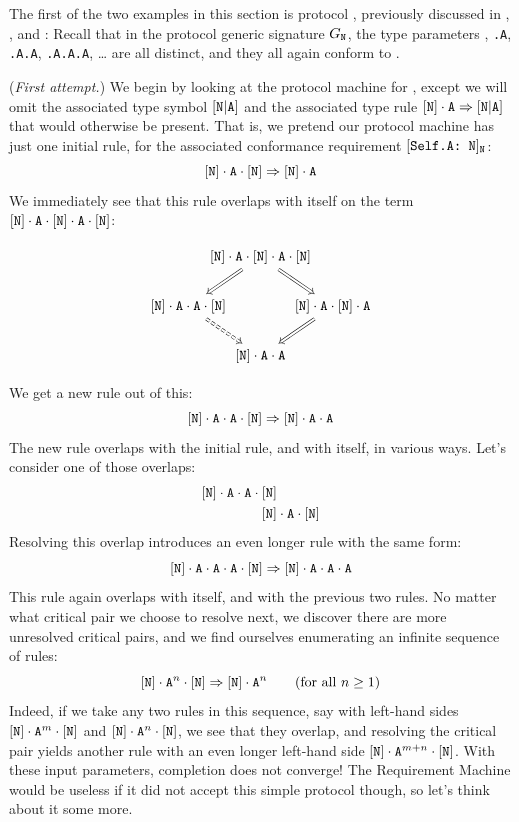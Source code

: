\documentclass[../generics]{subfiles}
\begin{document}
\begin{example}\label{ex:protocol n fcrs}
The first of the two examples in this section is protocol \tN, previously discussed in , , and :
Recall that in the protocol generic signature $G_{\texttt{N}}$, the type parameters \rT, \texttt{\rT.A}, \texttt{\rT.A.A}, \texttt{\rT.A.A.A}, \ldots{} are all distinct, and they all again conform to \tN.

\smallskip

(\emph{First attempt.}) We begin by looking at the protocol machine for \tN, except we will omit the associated type symbol $[\texttt{N}|\texttt{A}]$ and the associated type rule $[\texttt{N}] \cdot \texttt{A} \Rightarrow [\texttt{N}|\texttt{A}]$ that would otherwise be present. That is, we pretend our protocol machine has just one initial rule, for the associated conformance requirement $[\texttt{Self.A:~N}]_{\texttt{N}}$:
\[
[\texttt{N}]\cdot\texttt{A}\cdot[\texttt{N}]\Rightarrow [\texttt{N}]\cdot\texttt{A}
\]
We immediately see that this rule overlaps with itself on the term $[\texttt{N}] \cdot \texttt{A} \cdot [\texttt{N}] \cdot \texttt{A} \cdot [\texttt{N}]$:
\begin{ceqn}
\[
\begin{tikzcd}[column sep=-2em]
&\pN \cdot \nA \cdot \pN \cdot \nA \cdot \pN \arrow[ld, Rightarrow] \arrow[rd, Rightarrow]\\
\pN \cdot \nA \cdot \nA \cdot \pN \arrow[rd, Rightarrow, dashed] && \pN \cdot \nA \cdot \pN \cdot \nA \arrow[ld, Rightarrow] \\
& \pN \cdot \nA \cdot \nA
\end{tikzcd}
\]
\end{ceqn}
We get a new rule out of this:
\[
[\texttt{N}] \cdot \texttt{A} \cdot \texttt{A}\cdot[\texttt{N}]\Rightarrow [\texttt{N}] \cdot \texttt{A} \cdot \texttt{A}
\]
The new rule overlaps with the initial rule, and with itself, in various ways. Let's consider one of those overlaps:
\begin{align*}
[\texttt{N}] \cdot \texttt{A} \cdot \texttt{A} \cdot {} &[\texttt{N}] \\
&[\texttt{N}] \cdot \texttt{A} \cdot [\texttt{N}]
\end{align*}
Resolving this overlap introduces an even longer rule with the same form:
\[
[\texttt{N}] \cdot \texttt{A} \cdot \texttt{A} \cdot \texttt{A}\cdot[\texttt{N}]\Rightarrow [\texttt{N}] \cdot \texttt{A} \cdot \texttt{A} \cdot \texttt{A}
\]
This rule again overlaps with itself, and with the previous two rules. No matter what critical pair we choose to resolve next, we discover there are more unresolved critical pairs, and we find ourselves enumerating an infinite sequence of rules:
\[
[\texttt{N}] \cdot \texttt{A}^n\cdot[\texttt{N}]\Rightarrow [\texttt{N}] \cdot \texttt{A}^n \tag{for all $n \geq 1$}\\
\]
Indeed, if we take any two rules in this sequence, say with left-hand sides $[\texttt{N}] \cdot \texttt{A}^m \cdot [\texttt{N}]$ and $[\texttt{N}] \cdot \texttt{A}^n \cdot [\texttt{N}]$, we see that they overlap, and resolving the critical pair yields another rule with an even longer left-hand side $[\texttt{N}] \cdot \texttt{A}^{m+n} \cdot [\texttt{N}]$. With these input parameters, completion does not converge! The Requirement Machine would be useless if it did not accept this simple protocol though, so let's think about it some more.


\end{example}
\end{document}

